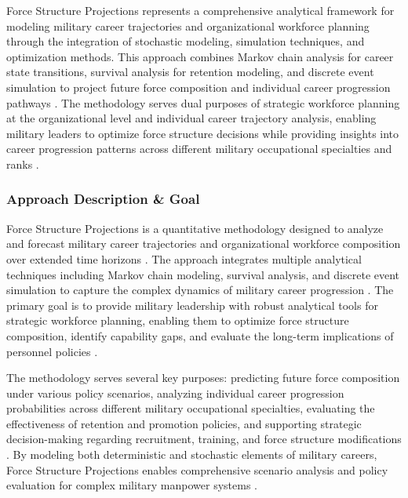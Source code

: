 \documentclass[main.tex]{subfiles}
\begin{document}
Force Structure Projections represents a comprehensive analytical framework for modeling military career trajectories and organizational workforce planning through the integration of stochastic modeling, simulation techniques, and optimization methods. This approach combines Markov chain analysis for career state transitions, survival analysis for retention modeling, and discrete event simulation to project future force composition and individual career progression pathways \parencite{eisler_allen,manpower_simulation}. The methodology serves dual purposes of strategic workforce planning at the organizational level and individual career trajectory analysis, enabling military leaders to optimize force structure decisions while providing insights into career progression patterns across different military occupational specialties and ranks \parencite{navy_manpower,army_white_paper}.

\subsubsection{Approach Description \& Goal}

Force Structure Projections is a quantitative methodology designed to analyze and forecast military career trajectories and organizational workforce composition over extended time horizons \parencite{manpower_simulation}. The approach integrates multiple analytical techniques including Markov chain modeling, survival analysis, and discrete event simulation to capture the complex dynamics of military career progression \parencite{eisler_allen}. The primary goal is to provide military leadership with robust analytical tools for strategic workforce planning, enabling them to optimize force structure composition, identify capability gaps, and evaluate the long-term implications of personnel policies \parencite{manpower_simulation,army_white_paper}. 

The methodology serves several key purposes: predicting future force composition under various policy scenarios, analyzing individual career progression probabilities across different military occupational specialties, evaluating the effectiveness of retention and promotion policies, and supporting strategic decision-making regarding recruitment, training, and force structure modifications \parencite{navy_manpower,eisler_allen}. By modeling both deterministic and stochastic elements of military careers, Force Structure Projections enables comprehensive scenario analysis and policy evaluation for complex military manpower systems \parencite{manpower_simulation}.
\end{document}
